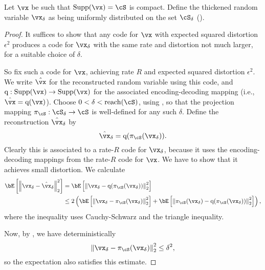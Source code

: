 \documentclass[../../book-main.tex]{subfiles}
\begin{document}
\begin{definition}\label{def:thickening-rv}
    Let $\vx$ be such that $\Supp(\vx) = \cS$ is compact.
    Define the thickened random variable $\vx_{\delta}$ as being uniformly
    distributed on the set $\cS_{\delta}$ ().
\end{definition}


\begin{lemma}
\end{lemma}

\begin{proof}
    It suffices to show that any code for $\vx$ with expected squared distortion
    $\epsilon^2$ produces a code for $\vx_{\delta}$ with the same rate and
    distortion not much larger, for a suitable choice of $\delta$.

    So fix such a code for $\vx$, achieving rate $R$ and expected squared
    distortion $\epsilon^2$. We write $\hat{\vx}$ for the reconstructed random
    variable using this code, and $\mathrm{q} : \Supp(\vx) \to \Supp(\vx)$
    for the associated encoding-decoding mapping (i.e., $\hat{\vx}
    = \mathrm{q}(\vx)$).
    Choose $0 < \delta < \mathrm{reach}(\cS)$, using
    , so that the projection mapping $\pi_{\cS}
    : \cS_{\delta} \to \cS$ is well-defined for any such $\delta$.
    Define the reconstruction $\hat{\vx}_{\delta}$ by
    \begin{equation}
        \hat{\vx}_{\delta} = \mathrm{q}( \pi_{\cS}(\vx_{\delta}) ).
    \end{equation}
    Clearly this is associated to a rate-$R$ code for $\vx_{\delta}$, because it
    uses the encoding-decoding mappings from the rate-$R$ code for $\vx$. We
    have to show that it achieves small distortion.
    We calculate
    \begin{align}
        \bE\left[ \norm*{ \vx_{\delta} - \hat{\vx}_{\delta} }_2^2 \right]
        &=
        \bE\left[ \norm*{ \vx_{\delta} - \mathrm{q}(\pi_{\cS}(\vx_{\delta})) }_2^2 \right]
        \\
        &\leq
        2 \left(
        \bE\left[ \norm*{ \vx_{\delta} - \pi_{\cS}(\vx_{\delta}) }_2^2 \right]
        + \bE\left[ \norm*{ \pi_{\cS}(\vx_{\delta}) - \mathrm{q}(\pi_{\cS}(\vx_{\delta})) }_2^2 \right]
        \right),
    \end{align}
    where the inequality uses Cauchy-Schwarz and the triangle inequality.

    Now, by , we have
    deterministically
    \begin{equation}
        \norm*{ \vx_{\delta} - \pi_{\cS}(\vx_{\delta}) }_2^2
        \leq \delta^2,
    \end{equation}
    so the expectation also satisfies this estimate.


\end{proof}
\end{document}
